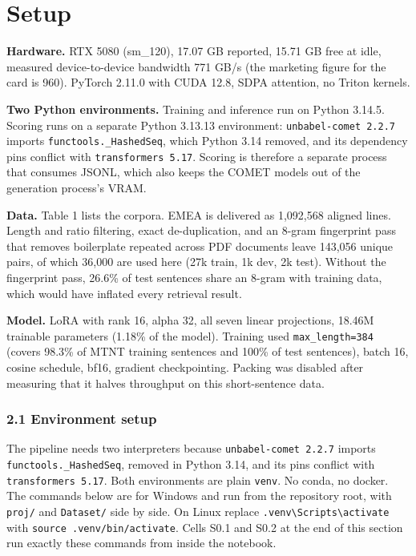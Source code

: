 \documentclass[a4paper,12pt,oneside]{article}
\begin{document}
\section{Setup}

\textbf{Hardware.} RTX 5080 (sm\_120), 17.07 GB reported, 15.71 GB free at idle, measured
device-to-device bandwidth 771 GB/s (the marketing figure for the card is 960). PyTorch 2.11.0
with CUDA 12.8, SDPA attention, no Triton kernels.

\textbf{Two Python environments.} Training and inference run on Python 3.14.5. Scoring runs on a
separate Python 3.13.13 environment: \texttt{unbabel-comet 2.2.7} imports \texttt{functools.\_HashedSeq}, which
Python 3.14 removed, and its dependency pins conflict with \texttt{transformers 5.17}. Scoring is
therefore a separate process that consumes JSONL, which also keeps the COMET models out of the
generation process's VRAM.

\textbf{Data.} Table 1 lists the corpora. EMEA is delivered as 1,092,568 aligned lines. Length and
ratio filtering, exact de-duplication, and an 8-gram fingerprint pass that removes boilerplate
repeated across PDF documents leave 143,056 unique pairs, of which 36,000 are used here (27k
train, 1k dev, 2k test). Without the fingerprint pass, 26.6\% of test sentences share an 8-gram
with training data, which would have inflated every retrieval result.

\textbf{Model.} LoRA with rank 16, alpha 32, all seven linear projections, 18.46M trainable parameters
(1.18\% of the model). Training used \texttt{max\_length=384} (covers 98.3\% of MTNT training sentences
and 100\% of test sentences), batch 16, cosine schedule, bf16, gradient checkpointing. Packing was
disabled after measuring that it halves throughput on this short-sentence data.

\subsubsection*{2.1 Environment setup}

The pipeline needs two interpreters because \texttt{unbabel-comet 2.2.7} imports \texttt{functools.\_HashedSeq},
removed in Python 3.14, and its pins conflict with \texttt{transformers 5.17}. Both environments are
plain \texttt{venv}. No conda, no docker. The commands below are for Windows and run from the repository
root, with \texttt{proj/} and \texttt{Dataset/} side by side. On Linux replace \texttt{.venv\textbackslash{}Scripts\textbackslash{}activate} with
\texttt{source .venv/bin/activate}. Cells S0.1 and S0.2 at the end of this section run exactly these
commands from inside the notebook.
\end{document}
